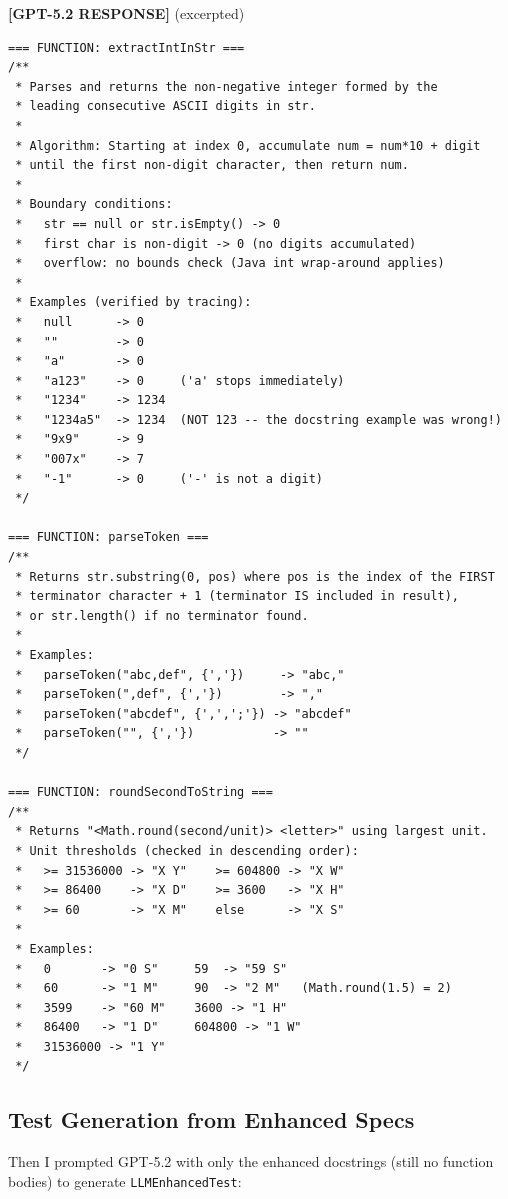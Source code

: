 \documentclass[acmsmall,nonacm]{acmart}
\begin{document}
\bigskip

\begin{responsebox}
\textbf{[GPT-5.2 RESPONSE]} (excerpted)

\begin{verbatim}
=== FUNCTION: extractIntInStr ===
/**
 * Parses and returns the non-negative integer formed by the
 * leading consecutive ASCII digits in str.
 *
 * Algorithm: Starting at index 0, accumulate num = num*10 + digit
 * until the first non-digit character, then return num.
 *
 * Boundary conditions:
 *   str == null or str.isEmpty() -> 0
 *   first char is non-digit -> 0 (no digits accumulated)
 *   overflow: no bounds check (Java int wrap-around applies)
 *
 * Examples (verified by tracing):
 *   null      -> 0
 *   ""        -> 0
 *   "a"       -> 0
 *   "a123"    -> 0     ('a' stops immediately)
 *   "1234"    -> 1234
 *   "1234a5"  -> 1234  (NOT 123 -- the docstring example was wrong!)
 *   "9x9"     -> 9
 *   "007x"    -> 7
 *   "-1"      -> 0     ('-' is not a digit)
 */

=== FUNCTION: parseToken ===
/**
 * Returns str.substring(0, pos) where pos is the index of the FIRST
 * terminator character + 1 (terminator IS included in result),
 * or str.length() if no terminator found.
 *
 * Examples:
 *   parseToken("abc,def", {','})     -> "abc,"
 *   parseToken(",def", {','})        -> ","
 *   parseToken("abcdef", {',',';'}) -> "abcdef"
 *   parseToken("", {','})           -> ""
 */

=== FUNCTION: roundSecondToString ===
/**
 * Returns "<Math.round(second/unit)> <letter>" using largest unit.
 * Unit thresholds (checked in descending order):
 *   >= 31536000 -> "X Y"    >= 604800 -> "X W"
 *   >= 86400    -> "X D"    >= 3600   -> "X H"
 *   >= 60       -> "X M"    else      -> "X S"
 *
 * Examples:
 *   0       -> "0 S"     59  -> "59 S"
 *   60      -> "1 M"     90  -> "2 M"   (Math.round(1.5) = 2)
 *   3599    -> "60 M"    3600 -> "1 H"
 *   86400   -> "1 D"     604800 -> "1 W"
 *   31536000 -> "1 Y"
 */
\end{verbatim}
\end{responsebox}

\subsection{Test Generation from Enhanced Specs}

Then I prompted GPT-5.2 with only the enhanced docstrings (still no function bodies) to
generate \texttt{LLMEnhancedTest}:
\end{document}
